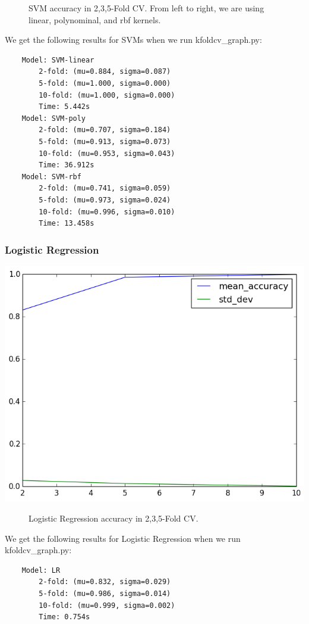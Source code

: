 \documentclass[fleqn]{article}
\begin{document}
\begin{center}
        \begin{figure}[!h]
            \caption{SVM accuracy in 2,3,5-Fold CV. From left to right, we are using
            linear, polynominal, and rbf kernels.}
        \end{figure}
    \end{center}
    We get the following results for SVMs when we run kfoldcv\_graph.py:
    \begin{lstlisting}
    Model: SVM-linear
        2-fold: (mu=0.884, sigma=0.087)
        5-fold: (mu=1.000, sigma=0.000)
        10-fold: (mu=1.000, sigma=0.000)
        Time: 5.442s
    Model: SVM-poly
        2-fold: (mu=0.707, sigma=0.184)
        5-fold: (mu=0.913, sigma=0.073)
        10-fold: (mu=0.953, sigma=0.043)
        Time: 36.912s
    Model: SVM-rbf
        2-fold: (mu=0.741, sigma=0.059)
        5-fold: (mu=0.973, sigma=0.024)
        10-fold: (mu=0.996, sigma=0.010)
        Time: 13.458s
    \end{lstlisting}

    \subsubsection{Logistic Regression}
    \begin{center}
        \includegraphics[scale=0.35]{model_accuracy_vs_folds_LR.png}
        \begin{figure}[!h]
            \caption{Logistic Regression accuracy in 2,3,5-Fold CV.}
        \end{figure}
    \end{center}
    We get the following results for Logistic Regression when we run kfoldcv\_graph.py:
    \begin{lstlisting}
    Model: LR
        2-fold: (mu=0.832, sigma=0.029)
        5-fold: (mu=0.986, sigma=0.014)
        10-fold: (mu=0.999, sigma=0.002)
        Time: 0.754s
    \end{lstlisting}
\end{document}
